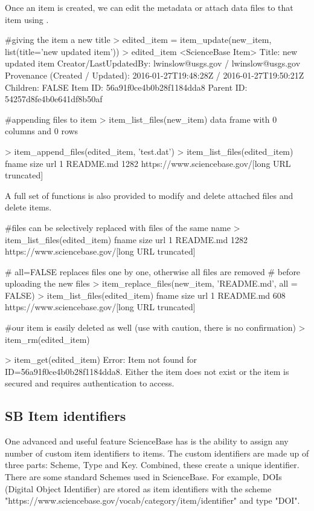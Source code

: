 Once an item is created, we can edit the metadata or attach data files to that 
item using . 

\begin{example}
#giving the item a new title
> edited_item = item_update(new_item, list(title='new updated item'))
> edited_item
<ScienceBase Item> 
  Title: new updated item
  Creator/LastUpdatedBy:     lwinslow@usgs.gov / lwinslow@usgs.gov
  Provenance (Created / Updated):  2016-01-27T19:48:28Z / 2016-01-27T19:50:21Z
  Children: FALSE
  Item ID: 56a91f0ce4b0b28f1184dda8
  Parent ID: 54257d8fe4b0e641df8b50af

#appending files to item
> item_list_files(new_item)
data frame with 0 columns and 0 rows

> item_append_files(edited_item, 'test.dat')
> item_list_files(edited_item)
      fname size     url
1 README.md 1282     https://www.sciencebase.gov/[long URL truncated]


\end{example}

A full set of functions is also provided to modify and delete attached 
files and delete items. 

\begin{example}
#files can be selectively replaced with files of the same name
> item_list_files(edited_item)
      fname size     url
1 README.md 1282     https://www.sciencebase.gov/[long URL truncated]

# all=FALSE replaces files one by one, otherwise all files are removed
# before uploading the new files
> item_replace_files(new_item, 'README.md', all = FALSE)
> item_list_files(edited_item)
      fname size     url
1 README.md 608     https://www.sciencebase.gov/[long URL truncated]

#our item is easily deleted as well (use with caution, there is no confirmation)
> item_rm(edited_item)

> item_get(edited_item)
Error: Item not found for ID=56a91f0ce4b0b28f1184dda8. Either the item does 
not exist or the item is secured and requires authentication to access.
\end{example}


\subsection{SB Item identifiers}
One advanced and useful feature ScienceBase has is the ability to assign any 
number of custom item identifiers to items. The custom identifiers are made up 
of three parts: Scheme, Type and Key. Combined, these create a unique identifier. 
There are some standard Schemes used in ScienceBase. For example, DOIs (Digital 
Object Identifier) are stored as item identifiers with the scheme 
"https://www.sciencebase.gov/vocab/category/item/identifier" and type "DOI". 

